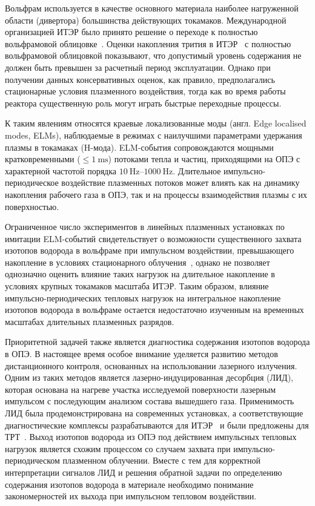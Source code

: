 Вольфрам используется в качестве основного материала наиболее нагруженной области (дивертора) большинства действующих токамаков. Международной организацией ИТЭР было принято решение о переходе к полностью вольфрамовой облицовке~\cite{Barabaschi2025}. Оценки накопления трития в ИТЭР~\cite{Roth1,Pitts2025} с полностью вольфрамовой облицовкой показывают, что допустимый уровень содержания не должен быть превышен за расчетный период эксплуатации. Однако при получении данных консервативных оценок, как правило, предполагались стационарные условия плазменного воздействия, тогда как во время работы реактора существенную роль могут играть быстрые переходные процессы.

К таким явлениям относятся краевые локализованные моды (англ. Edge localised modes, ELMs), наблюдаемые в режимах с наилучшими параметрами удержания плазмы в токамаках (H-мода). ELM-события сопровождаются мощными кратковременными ($\leq\SI{1}{\milli\second}$) потоками тепла и частиц, приходящими на ОПЭ с характерной частотой порядка \(\SIrange{10}{1000}{\hertz}\). Длительное импульсно-периодическое воздействие плазменных потоков может влиять как на динамику накопления рабочего газа в ОПЭ, так и на процессы взаимодействия плазмы с их поверхностью.

Ограниченное число экспериментов в линейных плазменных установках по имитации ELM-событий свидетельствует о возможности существенного захвата изотопов водорода в вольфраме при импульсном воздействии, превышающего накопление в условиях стационарного облучения~\cite{Nishijima2011,Poskakalov2020,Ogorodnikova}, однако не позволяет однозначно оценить влияние таких нагрузок на длительное накопление в условиях крупных токамаков масштаба ИТЭР. Таким образом, влияние импульсно-периодических тепловых нагрузок на интегральное накопление изотопов водорода в вольфраме остается недостаточно изученным на временных масштабах длительных плазменных разрядов.

Приоритетной задачей также является диагностика содержания изотопов водорода в ОПЭ. В настоящее время особое внимание уделяется развитию методов дистанционного контроля, основанных на использовании лазерного излучения. Одним из таких методов является лазерно-индуцированная десорбция (ЛИД), которая основана на нагреве участка исследуемой поверхности лазерным импульсом с последующим анализом состава вышедшего газа. Применимость ЛИД была продемонстрирована на современных установках, а соответствующие диагностические комплексы разрабатываются для ИТЭР~\cite{Huber2026} и были предложены для ТРТ~\cite{Razdobarin2022}. Выход изотопов водорода из ОПЭ под действием импульсных тепловых нагрузок является схожим процессом со случаем захвата при импульсно-периодическом плазменном облучении. Вместе с тем для корректной интерпретации сигналов ЛИД и решения обратной задачи по определению содержания изотопов водорода в материале необходимо понимание закономерностей их выхода при импульсном тепловом воздействии.

